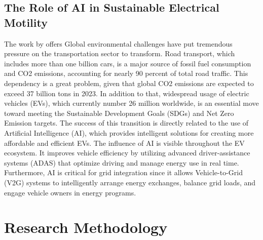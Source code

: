 \documentclass[a4paper, 12pt]{article}
\begin{document}
\subsection{The Role of AI in Sustainable Electrical Motility}
The work by \citet{M.rauf2024} offers Global environmental challenges have put tremendous pressure on the transportation sector to transform.  Road transport, which includes more than one billion cars, is a major source of fossil fuel consumption and CO2 emissions, accounting for nearly 90 percent of total road traffic. This dependency is a great problem, given that global CO2 emissions are expected to exceed 37 billion tons in 2023. In addition to that, widespread usage of electric vehicles (EVs), which currently number 26 million worldwide, is an essential move toward meeting the Sustainable Development Goals (SDGs) and Net Zero Emission targets.  The success of this transition is directly related to the use of Artificial Intelligence (AI), which provides intelligent solutions for creating more affordable and efficient EVs. The influence of AI is visible throughout the EV ecosystem. It improves vehicle efficiency by utilizing advanced driver-assistance systems (ADAS) that optimize driving and manage energy use in real time.  Furthermore, AI is critical for grid integration since it allows Vehicle-to-Grid (V2G) systems to intelligently arrange energy exchanges, balance grid loads, and engage vehicle owners in energy programs.


\section{Research Methodology}
\end{document}

